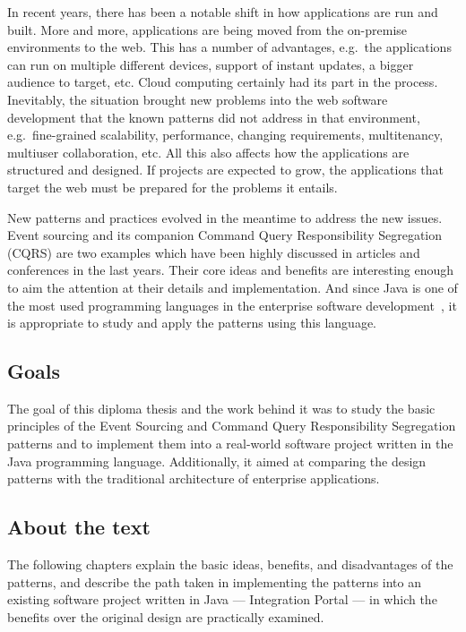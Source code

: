 \documentclass{book}
\begin{document}
In recent years, there has been a notable shift in how applications are
run and built. More and more, applications are being moved from the
on-premise environments to the web. This has a number of advantages,
e.g.~the applications can run on multiple different devices, support of instant
updates, a bigger audience to target, etc. Cloud computing
certainly had its part in the process. Inevitably, the situation brought
new problems into the web software development that the known patterns
did not address in that environment, e.g.~fine-grained scalability,
performance, changing requirements, multitenancy, multiuser
collaboration, etc. All this also affects how the applications are
structured and designed. If projects are expected to grow, the
applications that target the web must be prepared for the problems it
entails.

New patterns and practices evolved in the meantime to address the new
issues. Event sourcing and its companion Command Query Responsibility
Segregation (CQRS) are two examples which have been highly discussed in
articles and conferences in the last years. Their core ideas and
benefits are interesting enough to aim the attention at their details
and implementation. And since Java is one of the most used programming
languages in the enterprise software development~\cite{java}, it is
appropriate to study and apply the patterns using this language.

\subsection{Goals}\label{goals}

The goal of this diploma thesis and the work behind it was to study the
basic principles of the Event Sourcing and Command Query Responsibility
Segregation patterns and to implement them into a real-world software
project written in the Java programming language. Additionally, it aimed
at comparing the design patterns with the traditional architecture of
enterprise applications.

\subsection{About the text}\label{about-the-text}

The following chapters explain the basic ideas, benefits, and
disadvantages of the patterns, and describe the path taken in
implementing the patterns into an existing software project written in
Java --- Integration Portal --- in which the benefits over the original
design are practically examined.
\end{document}
